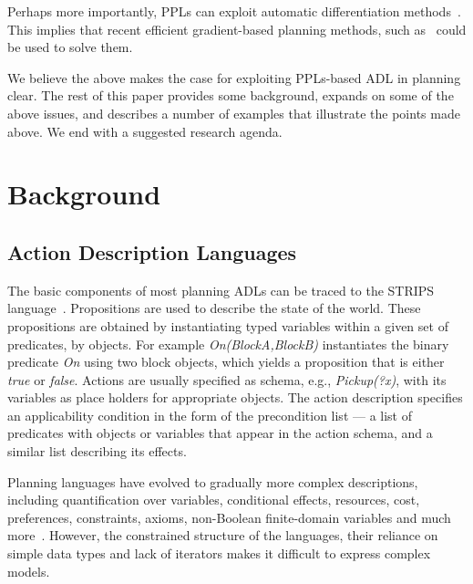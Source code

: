\documentclass[letterpaper]{article} %
\theoremstyle{definition}
\begin{document}
Perhaps more importantly, PPLs can exploit automatic differentiation methods~\cite{auto-diff}. This implies that 
recent efficient gradient-based planning methods, such as~\cite{pmlr-v130-bhandari21a} could be used to solve them.


We believe the above makes the case for exploiting PPLs-based ADL in planning clear. The rest of this paper provides some background, expands on some of the above issues, and describes a number of examples that illustrate the points made above. We end with a suggested research agenda.

\section{Background}
\subsection{Action Description Languages}

The basic components of most planning ADLs can be traced to the STRIPS language~\cite{STRIPS}. Propositions are used to describe the state of the world. These propositions are obtained by instantiating typed variables within a given
set of predicates, by objects. For example {\em On(BlockA,BlockB)} instantiates the binary predicate {\em On}
using two block objects, which yields a proposition that is either {\em true} or {\em false}. 
Actions are usually specified as schema, e.g., {\em Pickup(?x)}, with its variables as place holders for appropriate objects. The action description specifies an applicability condition in the form of the precondition list --- a list of predicates with objects or variables that appear in the action schema, and a similar list describing its effects.

Planning languages have evolved to gradually more
complex descriptions, including quantification over
variables, conditional effects, resources, cost, preferences, constraints, axioms, non-Boolean finite-domain variables and much more~\cite{PDDL2.1,PDDL3,SAS+}. However, the constrained structure of the languages, their reliance on simple data types and lack of iterators makes it difficult to express complex models.
\end{document}
